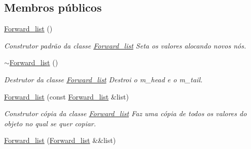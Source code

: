 \subsection*{Membros públicos}
\begin{DoxyCompactItemize}
\item 
\hyperlink{class_forward__list_aff553d52bc9688edecf161d1d2c0ac16}{Forward\+\_\+list} ()\hypertarget{class_forward__list_aff553d52bc9688edecf161d1d2c0ac16}{}\label{class_forward__list_aff553d52bc9688edecf161d1d2c0ac16}

\begin{DoxyCompactList}\small\item\em Construtor padrão da classe \hyperlink{class_forward__list}{Forward\+\_\+list} Seta os valores alocando novos nós. \end{DoxyCompactList}\item 
\hyperlink{class_forward__list_a05d2a10cf24da5f4c747a4775ad8841f}{$\sim$\+Forward\+\_\+list} ()\hypertarget{class_forward__list_a05d2a10cf24da5f4c747a4775ad8841f}{}\label{class_forward__list_a05d2a10cf24da5f4c747a4775ad8841f}

\begin{DoxyCompactList}\small\item\em Destrutor da classe \hyperlink{class_forward__list}{Forward\+\_\+list} Destroi o m\+\_\+head e o m\+\_\+tail. \end{DoxyCompactList}\item 
\hyperlink{class_forward__list_a5390537baf247165b6a74ef44802ceac}{Forward\+\_\+list} (const \hyperlink{class_forward__list}{Forward\+\_\+list} \&list)\hypertarget{class_forward__list_a5390537baf247165b6a74ef44802ceac}{}\label{class_forward__list_a5390537baf247165b6a74ef44802ceac}

\begin{DoxyCompactList}\small\item\em Construtor cópia da classe \hyperlink{class_forward__list}{Forward\+\_\+list} Faz uma cópia de todos os valores do objeto no qual se quer copiar. \end{DoxyCompactList}\item 
\hyperlink{class_forward__list_a6c812f45a8e1e8e6d591c138042f1fd8}{Forward\+\_\+list} (\hyperlink{class_forward__list}{Forward\+\_\+list} \&\&list)\hypertarget{class_forward__list_a6c812f45a8e1e8e6d591c138042f1fd8}{}\label{class_forward__list_a6c812f45a8e1e8e6d591c138042f1fd8}


\end{DoxyCompactItemize}

